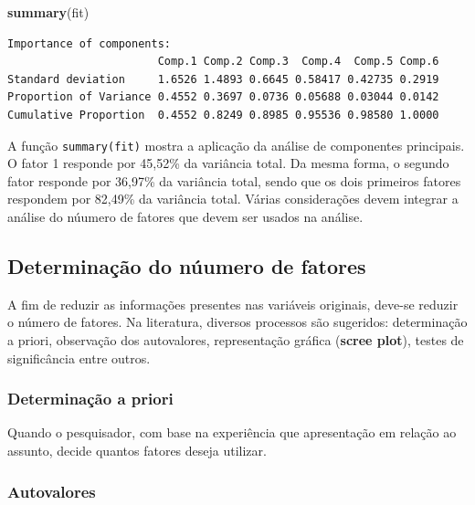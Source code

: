 \documentclass[12pt,brazil,oneside]{book}
\newenvironment{Shaded}{\begin{snugshade}}{\end{snugshade}}
\newcommand{\KeywordTok}[1]{\textcolor[rgb]{0.13,0.29,0.53}{\textbf{#1}}}
\newcommand{\NormalTok}[1]{#1}
\begin{document}
\begin{Shaded}
\begin{Highlighting}[]
\KeywordTok{summary}\NormalTok{(fit)}
\end{Highlighting}
\end{Shaded}

\begin{verbatim}
Importance of components:
                       Comp.1 Comp.2 Comp.3  Comp.4  Comp.5 Comp.6
Standard deviation     1.6526 1.4893 0.6645 0.58417 0.42735 0.2919
Proportion of Variance 0.4552 0.3697 0.0736 0.05688 0.03044 0.0142
Cumulative Proportion  0.4552 0.8249 0.8985 0.95536 0.98580 1.0000
\end{verbatim}

A função \texttt{summary(fit)} mostra a aplicação da análise de
componentes principais. O fator 1 responde por 45,52\% da variância
total. Da mesma forma, o segundo fator responde por 36,97\% da variância
total, sendo que os dois primeiros fatores respondem por 82,49\% da
variância total. Várias considerações devem integrar a análise do
núumero de fatores que devem ser usados na análise.

\hypertarget{determinacao-do-nuumero-de-fatores}{%
\subsection{Determinação do núumero de
fatores}\label{determinacao-do-nuumero-de-fatores}}

A fim de reduzir as informações presentes nas variáveis originais,
deve-se reduzir o número de fatores. Na literatura, diversos processos
são sugeridos: determinação a priori, observação dos autovalores,
representação gráfica (\textbf{scree plot}), testes de significância
entre outros.

\hypertarget{determinacao-a-priori}{%
\subsubsection{Determinação a priori}\label{determinacao-a-priori}}

Quando o pesquisador, com base na experiência que apresentação em
relação ao assunto, decide quantos fatores deseja utilizar.

\hypertarget{autovalores}{%
\subsubsection{Autovalores}\label{autovalores}}
\end{document}
